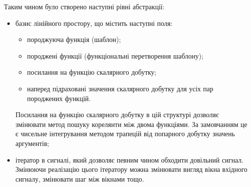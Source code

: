     Таким чином було створено наступні рівні абстракції:
    \begin{itemize}
        \item базис лінійного простору, що містить наступні поля:
            \begin{itemize}
                \item породжуюча функція (шаблон);
                \item породжені функції (функціональні перетворення шаблону);
                \item посилання на функцію скалярного добутку;
                \item наперед підраховані значення скалярного добутку для усіх пар породжених функцій.
            \end{itemize}

            Посилання на функцію скалярного добутку в цій структурі дозволяє змінювати метод пошуку корелянти між
            двома функціями.
            За замовчанням це є чисельне інтегрування методом трапецій від попарного добутку значень аргументів;
        \item ітератор в сигналі, який дозволяє певним чином обходити довільний сигнал.
            Змінюючи реалізацію цього ітератору можна змінювати вигляд вікна вхідного сигналу, змінювати шаг між
            вікнами тощо.
    \end{itemize}

